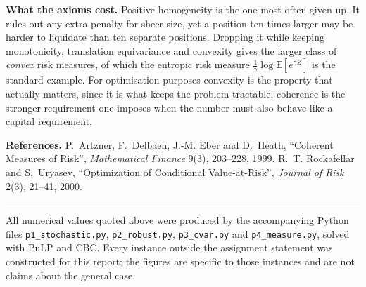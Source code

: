 \documentclass[11pt]{article}
\theoremstyle{definition}
\begin{document}
\textbf{What the axioms cost.} Positive homogeneity is the one most often
given up. It rules out any extra penalty for sheer size, yet a position
ten times larger may be harder to liquidate than ten separate positions.
Dropping it while keeping monotonicity, translation equivariance and
convexity gives the larger class of \emph{convex} risk measures, of which
the entropic risk measure $\tfrac1\gamma\log\mathbb{E}[e^{\gamma Z}]$ is
the standard example. For optimisation purposes convexity is the property
that actually matters, since it is what keeps the problem tractable;
coherence is the stronger requirement one imposes when the number must
also behave like a capital requirement.

\textbf{References.} P.~Artzner, F.~Delbaen, J.-M. Eber and D.~Heath,
``Coherent Measures of Risk'', \emph{Mathematical Finance} 9(3),
203--228, 1999. R.~T. Rockafellar and S.~Uryasev, ``Optimization of
Conditional Value-at-Risk'', \emph{Journal of Risk} 2(3), 21--41, 2000.

\vspace{1em}
\hrule
\vspace{0.6em}
{\small All numerical values quoted above were produced by the
accompanying Python files \texttt{p1\_stochastic.py},
\texttt{p2\_robust.py}, \texttt{p3\_cvar.py} and
\texttt{p4\_measure.py}, solved with PuLP and CBC. Every instance outside
the assignment statement was constructed for this report; the figures are
specific to those instances and are not claims about the general case.}
\end{document}
